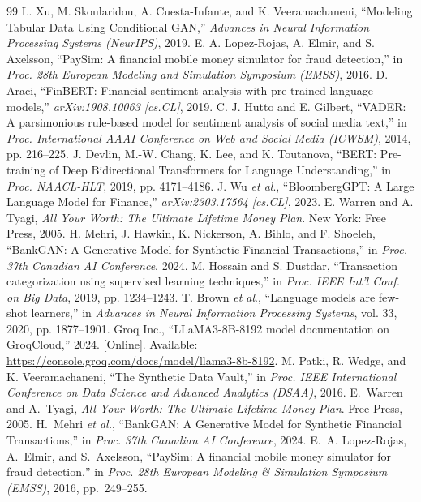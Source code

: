 \documentclass{scrartcl}
\begin{document}
\begin{thebibliography}{99}
 L. Xu, M. Skoularidou, A. Cuesta-Infante, and K. Veeramachaneni, “Modeling Tabular Data Using Conditional GAN,” \textit{Advances in Neural Information Processing Systems (NeurIPS)}, 2019.
 E. A. Lopez-Rojas, A. Elmir, and S. Axelsson, “PaySim: A financial mobile money simulator for fraud detection,” in \textit{Proc. 28th European Modeling and Simulation Symposium (EMSS)}, 2016.
 D. Araci, “FinBERT: Financial sentiment analysis with pre-trained language models,” \textit{arXiv:1908.10063 [cs.CL]}, 2019.
 C. J. Hutto and E. Gilbert, “VADER: A parsimonious rule-based model for sentiment analysis of social media text,” in \textit{Proc. International AAAI Conference on Web and Social Media (ICWSM)}, 2014, pp. 216–225.
 J. Devlin, M.-W. Chang, K. Lee, and K. Toutanova, “BERT: Pre-training of Deep Bidirectional Transformers for Language Understanding,” in \textit{Proc. NAACL-HLT}, 2019, pp. 4171–4186.
 J. Wu \textit{et al}., “BloombergGPT: A Large Language Model for Finance,” \textit{arXiv:2303.17564 [cs.CL]}, 2023.
 E. Warren and A. Tyagi, \textit{All Your Worth: The Ultimate Lifetime Money Plan}. New York: Free Press, 2005.
 H. Mehri, J. Hawkin, K. Nickerson, A. Bihlo, and F. Shoeleh, “BankGAN: A Generative Model for Synthetic Financial Transactions,” in \textit{Proc. 37th Canadian AI Conference}, 2024.
 M. Hossain and S. Dustdar, “Transaction categorization using supervised learning techniques,” in \textit{Proc. IEEE Int’l Conf. on Big Data}, 2019, pp. 1234–1243.
 T. Brown \textit{et al}., “Language models are few-shot learners,” in \textit{Advances in Neural Information Processing Systems}, vol. 33, 2020, pp. 1877–1901.
 Groq Inc., “LLaMA3-8B-8192 model documentation on GroqCloud,” 2024. [Online]. Available: \url{https://console.groq.com/docs/model/llama3-8b-8192}.
 M. Patki, R. Wedge, and K. Veeramachaneni, “The Synthetic Data Vault,” in \textit{Proc. IEEE International Conference on Data Science and Advanced Analytics (DSAA)}, 2016.
 E.~Warren and A.~Tyagi, \textit{All Your Worth: The Ultimate Lifetime Money Plan}. Free Press, 2005.
 H.~Mehri \textit{et al.}, “BankGAN: A Generative Model for Synthetic Financial Transactions,” in \textit{Proc. 37th Canadian AI Conference}, 2024.
 E.~A. Lopez-Rojas, A.~Elmir, and S.~Axelsson, “PaySim: A financial mobile money simulator for fraud detection,” in \textit{Proc. 28th European Modeling \& Simulation Symposium (EMSS)}, 2016, pp.~249--255.

\end{thebibliography}
\end{document}
